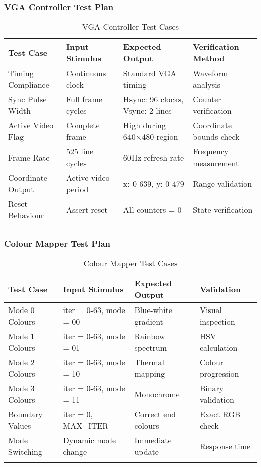 \documentclass[11pt,a4paper]{article}
\begin{document}
\subsubsection{VGA Controller Test Plan}
\begin{longtable}{|p{2cm}|p{2.5cm}|p{2.5cm}|p{4cm}|}
\hline
\rowcolor{darkgreen!20}
\textbf{Test Case} & \textbf{Input Stimulus} & \textbf{Expected Output} & \textbf{Verification Method} \\
\hline
Timing Compliance & Continuous clock & Standard VGA timing & Waveform analysis \\
\hline
Sync Pulse Width & Full frame cycles & Hsync: 96 clocks, Vsync: 2 lines & Counter verification \\
\hline
Active Video Flag & Complete frame & High during 640×480 region & Coordinate bounds check \\
\hline
Frame Rate & 525 line cycles & 60Hz refresh rate & Frequency measurement \\
\hline
Coordinate Output & Active video period & x: 0-639, y: 0-479 & Range validation \\
\hline
Reset Behaviour & Assert reset & All counters = 0 & State verification \\
\hline
\caption{VGA Controller Test Cases}
\end{longtable}

\subsubsection{Colour Mapper Test Plan}
\begin{longtable}{|p{2cm}|p{2.5cm}|p{2.5cm}|p{4cm}|}
\hline
\rowcolor{purple!20}
\textbf{Test Case} & \textbf{Input Stimulus} & \textbf{Expected Output} & \textbf{Validation} \\
\hline
Mode 0 Colours & iter = 0-63, mode = 00 & Blue-white gradient & Visual inspection \\
\hline
Mode 1 Colours & iter = 0-63, mode = 01 & Rainbow spectrum & HSV calculation \\
\hline
Mode 2 Colours & iter = 0-63, mode = 10 & Thermal mapping & Colour progression \\
\hline
Mode 3 Colours & iter = 0-63, mode = 11 & Monochrome & Binary validation \\
\hline
Boundary Values & iter = 0, MAX\_ITER & Correct end colours & Exact RGB check \\
\hline
Mode Switching & Dynamic mode change & Immediate update & Response time \\
\hline
\caption{Colour Mapper Test Cases}
\end{longtable}
\end{document}
